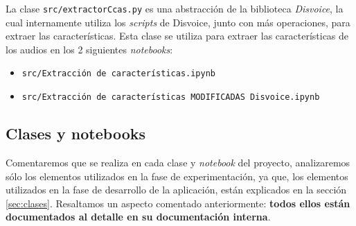 La clase \texttt{src/extractorCcas.py} es una abstracción de la biblioteca \textit{Disvoice}, la cual internamente utiliza los  \textit{scripts} de Disvoice, junto con más operaciones, para extraer las características.  Esta clase se utiliza para extraer las características de los audios en los 2 siguientes \textit{notebooks}:
\begin{itemize}
\item \texttt{src/Extracción de características.ipynb}
\item \texttt{src/Extracción de características MODIFICADAS Disvoice.ipynb}
\end{itemize}

\subsection{Clases y notebooks}
Comentaremos que se realiza en cada clase y \textit{notebook} del proyecto, analizaremos sólo los elementos utilizados en la fase de experimentación, ya que, los elementos utilizados en la fase de desarrollo de la aplicación, están explicados en la sección \ref{sec:clases}. Resaltamos un aspecto comentado anteriormente: \textbf{todos ellos están documentados al detalle en su documentación interna}.
